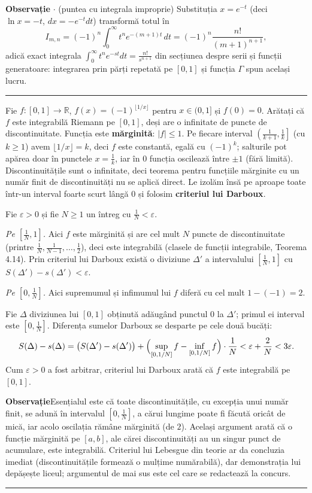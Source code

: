 \medskip
\noindent\textbf{Observație} $\cdot$ (puntea cu integrala improprie) Substituția $x = e^{-t}$ (deci $\ln x = -t$, $dx = -e^{-t}dt$) transformă totul în
\[
I_{m,n} = (-1)^n \int_0^{\infty} t^n e^{-(m+1)t} \, dt = (-1)^n \frac{n!}{(m+1)^{n+1}},
\]
adică exact integrala $\int_0^{\infty} t^n e^{-st} dt = \frac{n!}{s^{n+1}}$ din secțiunea despre serii și funcții generatoare: integrarea prin părți repetată pe $[0,1]$ și funcția $\Gamma$ spun același lucru.
\vspace{1mm}\hrule

Fie $f : [0,1] \to \mathbb{R}$, $f(x) = (-1)^{\lfloor 1/x \rfloor}$ pentru $x \in (0,1]$ și $f(0) = 0$. Arătați că $f$ este integrabilă Riemann pe $[0,1]$, deși are o infinitate de puncte de discontinuitate.
\sol Funcția este \textbf{mărginită}: $|f| \le 1$. Pe fiecare interval $\left(\tfrac{1}{k+1}, \tfrac{1}{k}\right]$ (cu $k \ge 1$) avem $\lfloor 1/x \rfloor = k$, deci $f$ este constantă, egală cu $(-1)^k$; salturile pot apărea doar în punctele $x = \tfrac{1}{k}$, iar în $0$ funcția oscilează între $\pm 1$ (fără limită). Discontinuitățile sunt o infinitate, deci teorema pentru funcțiile mărginite cu un număr finit de discontinuități nu se aplică direct. Le izolăm însă pe aproape toate într-un interval foarte scurt lângă $0$ și folosim \textbf{criteriul lui Darboux}.

Fie $\varepsilon>0$ și fie $N\ge1$ un întreg cu $\frac1N<\varepsilon$.

\emph{Pe $\left[\frac1N,1\right]$.} Aici $f$ este mărginită și are cel mult $N$ puncte de discontinuitate (printre $\frac1N,\frac1{N-1},\dots,\frac12$), deci este integrabilă (clasele de funcții integrabile, Teorema 4.14). Prin criteriul lui Darboux există o diviziune $\Delta'$ a intervalului $\left[\frac1N,1\right]$ cu $S(\Delta')-s(\Delta')<\varepsilon$.

\emph{Pe $\left[0,\frac1N\right]$.} Aici supremumul și infimumul lui $f$ diferă cu cel mult $1-(-1)=2$.

Fie $\Delta$ diviziunea lui $[0,1]$ obținută adăugând punctul $0$ la $\Delta'$; primul ei interval este $\left[0,\frac1N\right]$. Diferența sumelor Darboux se desparte pe cele două bucăți:
\[
S(\Delta)-s(\Delta)=\bigl(S(\Delta')-s(\Delta')\bigr)+\Bigl(\sup_{[0,1/N]}f-\inf_{[0,1/N]}f\Bigr)\cdot\frac1N<\varepsilon+\frac2N<3\varepsilon .
\]
Cum $\varepsilon>0$ a fost arbitrar, criteriul lui Darboux arată că $f$ este integrabilă pe $[0,1]$.

\medskip
\noindent\textbf{Observație}\quad Esențialul este că toate discontinuitățile, cu excepția unui număr finit, se adună în intervalul $\left[0,\frac1N\right]$, a cărui lungime poate fi făcută oricât de mică, iar acolo oscilația rămâne mărginită (de $2$). Același argument arată că o funcție mărginită pe $[a,b]$, ale cărei discontinuități au un singur punct de acumulare, este integrabilă. Criteriul lui Lebesgue din teorie ar da concluzia imediat (discontinuitățile formează o mulțime numărabilă), dar demonstrația lui depășește liceul; argumentul de mai sus este cel care se redactează la concurs.
\vspace{1mm}\hrule

